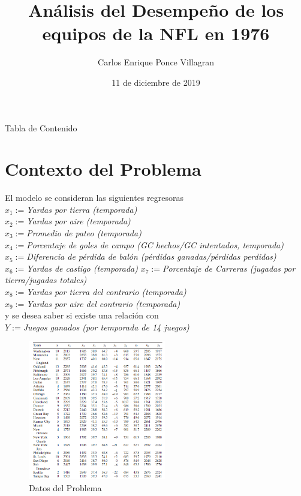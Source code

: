 \documentclass[11pt]{beamer}
\author{Carlos Enrique Ponce Villagran}
\title[Análisis de los equipos de la NFL]{Análisis del Desempeño de los equipos de la NFL en 1976}
\institute[FCFM]{Facultad de ciencias Físico-Matemáticas}
\date{11 de diciembre de 2019}
\begin{document}
\begin{frame}
\titlepage
\end{frame}

\begin{frame}{Tabla de Contenido}
\tableofcontents
\end{frame}

\section{Contexto del Problema}

\begin{frame}
\tableofcontents[currentsection]
\end{frame}

\begin{frame}
El modelo se consideran las siguientes regresoras\\
 $x_{1}:=$\textit{Yardas por tierra (temporada)}\\
 $x_{2}:=$\textit{Yardas por aire (temporada)} \\
 $x_{3}:=$\textit{Promedio de pateo (temporada)}\\
 $x_{4}:=$\textit{Porcentaje de goles de campo (GC hechos/GC intentados, temporada)}\\
 $x_{5}:=$\textit{Diferencia de pérdida de balón (pérdidas ganadas/pérdidas perdidas)}\\
$x_{6}:=$\textit{Yardas de castigo (temporada)}  
 $x_{7}:=$\textit{Porcentaje de Carreras (jugadas por tierra/jugadas totales)} \\
  $x_{8}:=$\textit{Yardas por tierra del contrario (temporada)} \\
  $x_{9}:=$\textit{Yardas por aire del contrario (temporada)}\\
  
  y se desea saber si existe una relación con \\
  $Y:=$\textit{Juegos ganados (por temporada de 14 juegos)}
\end{frame}

\begin{frame}
\begin{figure}[hbtp]
\centering
\includegraphics[width=6cm]{TablaDatos.png}
\caption{Datos del Problema}
\end{figure}

\end{frame}
\end{document}
